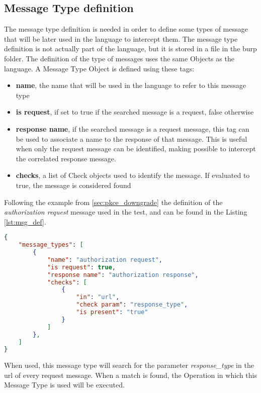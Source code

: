 \subsection{Message Type definition}
The message type definition is needed in order to define some types of message that will be later used in the language to intercept them.
The message type definition is not actually part of the language, but it is stored in a file in the \Gls{burp} folder. The definition of the type of messages uses the same Objects as the language.
A Message Type Object is defined using these tags:
\begin{itemize}
    \item \textbf{name}, the name that will be used in the language to refer to this message type
    \item \textbf{is request}, if set to true if the searched message is a request, false otherwise
    \item \textbf{response name}, if the searched message is a request message, this tag can be used to associate a name to the response of that message. This is useful when only the request message can be identified, making possible to intercept the correlated response message.
    \item \textbf{checks}, a list of Check objects used to identify the message. If evaluated to true, the message is considered found
\end{itemize}

Following the example from \ref{sec:pkce_downgrade} the definition of the \textit{authorization request} message used in the test, and can be found in the Listing \ref{lst:msg_def}.

\begin{lstlisting}[language=json, caption=Message Types definition, label={lst:msg_def}]
{
    "message_types": [
        {
            "name": "authorization request",
            "is request": true,
            "response name": "authorization response",
            "checks": [
                {
                    "in": "url",
                    "check param": "response_type",
                    "is present": "true"
                }
            ]
        },
    ]
}
\end{lstlisting}

When used, this message type will search for the parameter \textit{response\_type} in the url of every request message. When a match is found, the Operation in which this Message Type is used will be executed.


